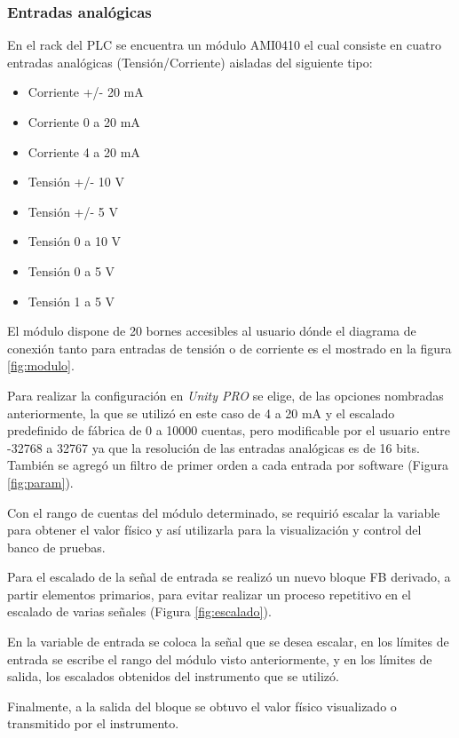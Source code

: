 \subsubsection{Entradas analógicas}
En el rack del PLC se encuentra un módulo AMI0410 el cual consiste en cuatro entradas analógicas (Tensión/Corriente) aisladas del siguiente tipo:
\begin{itemize}
	\item Corriente +/- 20 mA
\item 	Corriente 0 a 20 mA
\item 	Corriente 4 a 20 mA
\item 	Tensión +/- 10 V
\item 	Tensión +/- 5 V
\item 	Tensión 0 a 10 V
\item 	Tensión 0 a 5 V
\item 	Tensión 1 a 5 V
	
\end{itemize}

El módulo dispone de 20 bornes accesibles al usuario dónde el diagrama de conexión tanto para entradas de tensión o de corriente es el mostrado en la figura \ref{fig:modulo}.

Para realizar la configuración en \textit{Unity PRO} se elige, de las opciones nombradas anteriormente, la que se utilizó en este caso de 4 a 20 mA y el escalado predefinido de fábrica de 0 a 10000 cuentas, pero modificable por el usuario entre -32768 a 32767 ya que la resolución de las entradas analógicas es de 16 bits. También se agregó un filtro de primer orden a cada entrada por software (Figura \ref{fig:param}).

Con el rango de cuentas del módulo determinado, se requirió escalar la variable para obtener el valor físico y así utilizarla para la visualización y control del banco de pruebas.

Para el escalado de la señal de entrada se realizó un nuevo bloque FB derivado, a partir elementos primarios, para evitar realizar un proceso repetitivo en el escalado de varias señales (Figura \ref{fig:escalado}).

En la variable de entrada se coloca la señal que se desea escalar, en los límites de entrada se escribe el rango del módulo visto anteriormente, y en los límites de salida, los escalados obtenidos del instrumento que se utilizó.

 Finalmente, a la salida del bloque se obtuvo el valor físico visualizado o transmitido por el instrumento.

